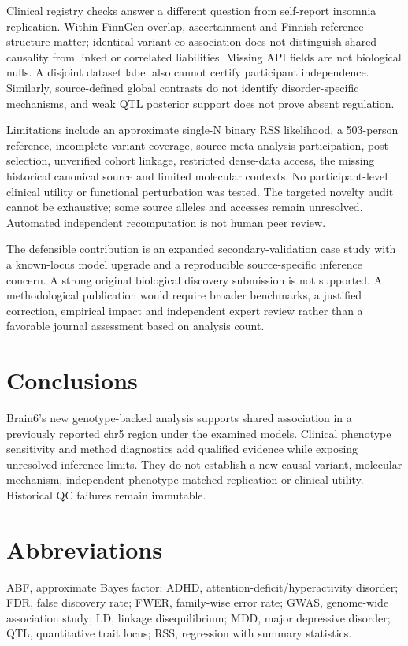 \documentclass[11pt]{article}
\begin{document}
Clinical registry checks answer a different question from self-report insomnia replication. Within-FinnGen overlap, ascertainment and Finnish reference structure matter; identical variant co-association does not distinguish shared causality from linked or correlated liabilities. Missing API fields are not biological nulls. A disjoint dataset label also cannot certify participant independence. Similarly, source-defined global contrasts do not identify disorder-specific mechanisms, and weak QTL posterior support does not prove absent regulation.

Limitations include an approximate single-N binary RSS likelihood, a 503-person reference, incomplete variant coverage, source meta-analysis participation, post-selection, unverified cohort linkage, restricted dense-data access, the missing historical canonical source and limited molecular contexts. No participant-level clinical utility or functional perturbation was tested. The targeted novelty audit cannot be exhaustive; some source alleles and accesses remain unresolved. Automated independent recomputation is not human peer review.

The defensible contribution is an expanded secondary-validation case study with a known-locus model upgrade and a reproducible source-specific inference concern. A strong original biological discovery submission is not supported. A methodological publication would require broader benchmarks, a justified correction, empirical impact and independent expert review rather than a favorable journal assessment based on analysis count.

\section*{Conclusions}
Brain6's new genotype-backed analysis supports shared association in a previously reported chr5 region under the examined models. Clinical phenotype sensitivity and method diagnostics add qualified evidence while exposing unresolved inference limits. They do not establish a new causal variant, molecular mechanism, independent phenotype-matched replication or clinical utility. Historical QC failures remain immutable.

\section*{Abbreviations}
ABF, approximate Bayes factor; ADHD, attention-deficit/hyperactivity disorder; FDR, false discovery rate; FWER, family-wise error rate; GWAS, genome-wide association study; LD, linkage disequilibrium; MDD, major depressive disorder; QTL, quantitative trait locus; RSS, regression with summary statistics.
\end{document}
